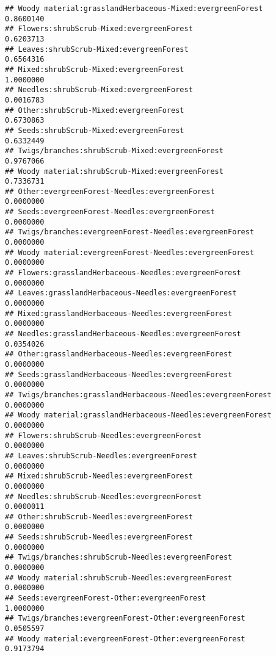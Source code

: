 \documentclass[
]{article}
\begin{document}
\begin{verbatim}
## Woody material:grasslandHerbaceous-Mixed:evergreenForest              0.8600140
## Flowers:shrubScrub-Mixed:evergreenForest                              0.6203713
## Leaves:shrubScrub-Mixed:evergreenForest                               0.6564316
## Mixed:shrubScrub-Mixed:evergreenForest                                1.0000000
## Needles:shrubScrub-Mixed:evergreenForest                              0.0016783
## Other:shrubScrub-Mixed:evergreenForest                                0.6730863
## Seeds:shrubScrub-Mixed:evergreenForest                                0.6332449
## Twigs/branches:shrubScrub-Mixed:evergreenForest                       0.9767066
## Woody material:shrubScrub-Mixed:evergreenForest                       0.7336731
## Other:evergreenForest-Needles:evergreenForest                         0.0000000
## Seeds:evergreenForest-Needles:evergreenForest                         0.0000000
## Twigs/branches:evergreenForest-Needles:evergreenForest                0.0000000
## Woody material:evergreenForest-Needles:evergreenForest                0.0000000
## Flowers:grasslandHerbaceous-Needles:evergreenForest                   0.0000000
## Leaves:grasslandHerbaceous-Needles:evergreenForest                    0.0000000
## Mixed:grasslandHerbaceous-Needles:evergreenForest                     0.0000000
## Needles:grasslandHerbaceous-Needles:evergreenForest                   0.0354026
## Other:grasslandHerbaceous-Needles:evergreenForest                     0.0000000
## Seeds:grasslandHerbaceous-Needles:evergreenForest                     0.0000000
## Twigs/branches:grasslandHerbaceous-Needles:evergreenForest            0.0000000
## Woody material:grasslandHerbaceous-Needles:evergreenForest            0.0000000
## Flowers:shrubScrub-Needles:evergreenForest                            0.0000000
## Leaves:shrubScrub-Needles:evergreenForest                             0.0000000
## Mixed:shrubScrub-Needles:evergreenForest                              0.0000000
## Needles:shrubScrub-Needles:evergreenForest                            0.0000011
## Other:shrubScrub-Needles:evergreenForest                              0.0000000
## Seeds:shrubScrub-Needles:evergreenForest                              0.0000000
## Twigs/branches:shrubScrub-Needles:evergreenForest                     0.0000000
## Woody material:shrubScrub-Needles:evergreenForest                     0.0000000
## Seeds:evergreenForest-Other:evergreenForest                           1.0000000
## Twigs/branches:evergreenForest-Other:evergreenForest                  0.0505597
## Woody material:evergreenForest-Other:evergreenForest                  0.9173794

\end{verbatim}
\end{document}
